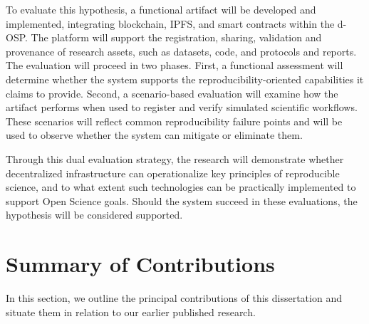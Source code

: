 \documentclass[final]{rc-book-2.14}
\begin{document}
To evaluate this hypothesis, a functional artifact will be developed and implemented, integrating blockchain, IPFS, and smart contracts within the d-OSP. The platform will support the registration, sharing, validation and provenance of research assets, such as datasets, code, and protocols and reports. The evaluation will proceed in two phases. First, a functional assessment will determine whether the system supports the reproducibility-oriented capabilities it claims to provide. Second, a scenario-based evaluation will examine how the artifact performs when used to register and verify simulated scientific workflows. These scenarios will reflect common reproducibility failure points and will be used to observe whether the system can mitigate or eliminate them.

Through this dual evaluation strategy, the research will demonstrate whether decentralized infrastructure can operationalize key principles of reproducible science, and to what extent such technologies can be practically implemented to support Open Science goals. Should the system succeed in these evaluations, the hypothesis will be considered supported. 

\section{Summary of Contributions}
\label{chp:intro:sec:contributions}

In this section, we outline the principal contributions of this dissertation and situate them in relation to our earlier published research. 
\end{document}
